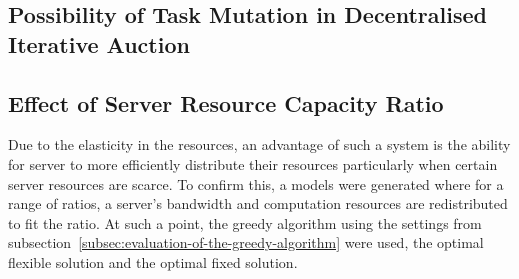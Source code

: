 \subsection{Possibility of Task Mutation in Decentralised Iterative Auction}
\label{subsec:possibility-of-task-mutation-in-decentralised-iterative-auction}

\subsection{Effect of Server Resource Capacity Ratio}
\label{subsec:affect-of-server-resource-capacity-ratio}
Due to the elasticity in the resources, an advantage of such a system is the ability for server to more efficiently
distribute their resources particularly when certain server resources are scarce. To confirm this, a models were
generated where for a range of ratios, a server's bandwidth and computation resources are redistributed to fit the
ratio. At such a point, the greedy algorithm using the settings from
subsection~\ref{subsec:evaluation-of-the-greedy-algorithm} were used, the optimal flexible solution and the optimal
fixed solution.

